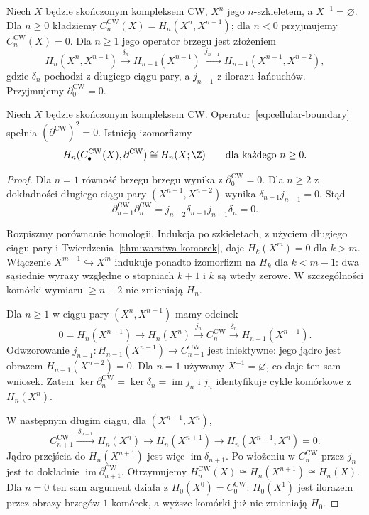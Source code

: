 \begin{definicja}
\label{def:kompleks-komorkowy}
Niech $X$ będzie skończonym kompleksem CW,
$X^n$ jego $n$-szkieletem, a $X^{-1}=\varnothing$.
Dla $n\geq0$ kładziemy
$C_n^{\mathrm{CW}}(X)=H_n(X^n,X^{n-1})$;
dla $n<0$ przyjmujemy $C_n^{\mathrm{CW}}(X)=0$.
Dla $n\geq1$ jego operator brzegu
jest złożeniem
\begin{equation}\label{eq:cellular-boundary}
 H_n(X^n,X^{n-1})
 \xrightarrow{\ \delta_n\ }
 H_{n-1}(X^{n-1})
 \xrightarrow{\ j_{n-1}\ }
 H_{n-1}(X^{n-1},X^{n-2}),
\end{equation}
gdzie $\delta_n$ pochodzi z
długiego ciągu pary, a
$j_{n-1}$ z ilorazu łańcuchów.
Przyjmujemy $\partial_0^{\mathrm{CW}}=0$.
\end{definicja}

\begin{twierdzenie}
\label{thm:komorkowa-singularna}
Niech $X$ będzie skończonym kompleksem CW.
Operator~\eqref{eq:cellular-boundary}
spełnia $(\partial^{\mathrm{CW}})^2=0$.
Istnieją izomorfizmy
\[
 H_n(C_\bullet^{\mathrm{CW}}(X),
       \partial^{\mathrm{CW}})
 \cong H_n(X;\Z)
 \qquad\text{dla każdego }n\geq0.
\]
\end{twierdzenie}
\begin{proof}
Dla $n=1$ równość brzegu brzegu wynika z $\partial_0^{\mathrm{CW}}=0$.
Dla $n\geq2$ z dokładności długiego ciągu
pary $(X^{n-1},X^{n-2})$
wynika $\delta_{n-1}j_{n-1}=0$.
Stąd
\[
 \partial^{\mathrm{CW}}_{n-1}
 \partial^{\mathrm{CW}}_n
 =j_{n-2}\delta_{n-1}j_{n-1}\delta_n=0.
\]

Rozpiszmy porównanie homologii.
Indukcja po szkieletach,
z użyciem długiego ciągu pary
i Twierdzenia~\ref{thm:warstwa-komorek},
daje $H_k(X^m)=0$ dla $k>m$.
Włączenie $X^{m-1}\hookrightarrow X^m$
indukuje ponadto izomorfizm na
$H_k$ dla $k<m-1$: dwa sąsiednie
wyrazy względne o stopniach
$k+1$ i $k$ są wtedy zerowe.
W szczególności komórki wymiaru
$\geq n+2$ nie zmieniają $H_n$.

Dla $n\geq1$ w ciągu pary
$(X^n,X^{n-1})$ mamy odcinek
\[
 0=H_n(X^{n-1})\longrightarrow
 H_n(X^n)\xrightarrow{\ j_n\ }
 C_n^{\mathrm{CW}}
 \xrightarrow{\ \delta_n\ }
 H_{n-1}(X^{n-1}).
\]
Odwzorowanie $j_{n-1}:H_{n-1}(X^{n-1})
\to C_{n-1}^{\mathrm{CW}}$
jest iniektywne: jego jądro
jest obrazem
$H_{n-1}(X^{n-2})=0$.
Dla $n=1$ używamy
$X^{-1}=\varnothing$, co daje
ten sam wniosek.
Zatem $\ker\partial_n^{\mathrm{CW}}
=\ker\delta_n=\operatorname{im}j_n$
i $j_n$ identyfikuje cykle
komórkowe z $H_n(X^n)$.

W następnym długim ciągu,
dla $(X^{n+1},X^n)$,
\[
 C_{n+1}^{\mathrm{CW}}
 \xrightarrow{\ \delta_{n+1}\ }
 H_n(X^n)\longrightarrow
 H_n(X^{n+1})\longrightarrow
 H_n(X^{n+1},X^n)=0.
\]
Jądro przejścia do $H_n(X^{n+1})$
jest więc $\operatorname{im}\delta_{n+1}$.
Po włożeniu w $C_n^{\mathrm{CW}}$
przez $j_n$ jest to dokładnie
$\operatorname{im}\partial_{n+1}^{\mathrm{CW}}$.
Otrzymujemy
$H_n^{\mathrm{CW}}(X)\cong
H_n(X^{n+1})\cong H_n(X)$.
Dla $n=0$ ten sam argument działa
z $H_0(X^0)=C_0^{\mathrm{CW}}$:
$H_0(X^1)$ jest ilorazem przez
obrazy brzegów $1$-komórek,
a wyższe komórki już nie
zmieniają $H_0$.
\end{proof}

